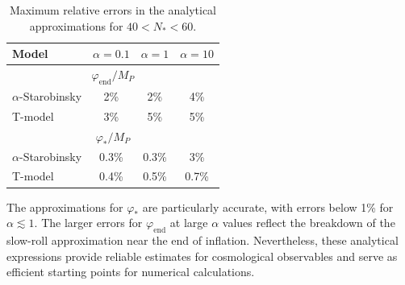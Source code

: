 \documentclass[aps,prev,twocolumn,preprintnumbers,floatfix,nofootinbib]{revtex4-1}
\begin{document}
\begin{table}[h]
\centering
\caption{Maximum relative errors in the analytical approximations for $40 < N_* < 60$.}
\label{tab:accuracy}
\vspace{3mm}
\begin{tabular}{l|c|c|c}
\hline\hline
Model & $\alpha = 0.1$ & $\alpha = 1$ & $\alpha = 10$ \\
\hline
\multicolumn{4}{c}{$\varphi_{\mathrm{end}}/M_P$} \\
\hline
$\alpha$-Starobinsky & 2\% & 2\% & 4\% \\
T-model & 3\% & 5\% & 5\% \\
\hline
\multicolumn{4}{c}{$\varphi_*/M_P$} \\
\hline
$\alpha$-Starobinsky & 0.3\% & 0.3\% & 3\% \\
T-model & 0.4\% & 0.5\% & 0.7\% \\
\hline\hline
\end{tabular}
\end{table}

The approximations for $\varphi_*$ are particularly accurate, with errors below 1\% for $\alpha \lesssim 1$. The larger errors for $\varphi_{\mathrm{end}}$ at large $\alpha$ values reflect the breakdown of the slow-roll approximation near the end of inflation. Nevertheless, these analytical expressions provide reliable estimates for cosmological observables and serve as efficient starting points for numerical calculations.
\end{document}
